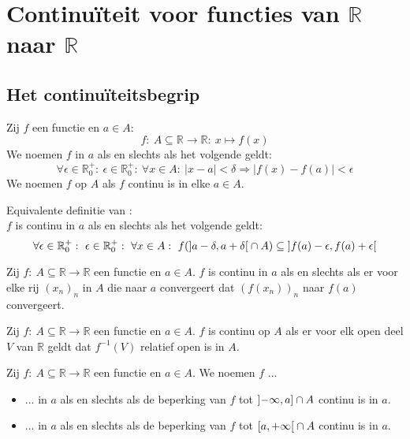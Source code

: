 \documentclass[main.tex]{subfiles}
\begin{document}
\chapter{Continu\"iteit voor functies van $\mathbb{R}$ naar $\mathbb{R}$}
\label{cha:cont-in-r}

\section{Het continu\"iteitsbegrip}
\label{sec:het-cont}


\begin{de}
  Zij $f$ een functie en $a\in A$:
  \[ f:\ A \subseteq \mathbb{R} \rightarrow \mathbb{R}:\ x \mapsto f(x) \]
  We noemen $f$  in $a$ als en slechts als het volgende geldt:
  \[ \forall \epsilon \in \mathbb{R}_{0}^{+}:\ \epsilon \in \mathbb{R}_{0}^{+}:\ \forall x\in A:\ |x-a| < \delta \Rightarrow |f(x) -f(a)| < \epsilon \]
  We noemen $f$  op $A$ als $f$ continu is in elke $a\in A$.
\end{de}

\begin{st}
  Equivalente definitie van :\\
  $f$ is continu in $a$ als en slechts als het volgende geldt:
  \[ \forall \epsilon \in \mathbb{R}_{0}^{+}:\ \epsilon \in \mathbb{R}_{0}^{+}:\ \forall x\in A:\ f(\interval[open]{a-\delta}{a+\delta} \cap A) \subseteq \interval[open]{f(a)-\epsilon}{f(a)+\epsilon} \]
\end{st}

\begin{pr}
  Zij $f:\ A \subseteq \mathbb{R} \rightarrow \mathbb{R}$ een functie en $a\in A$.
  $f$ is continu in $a$ als en slechts als er voor elke rij $(x_{n})_{n}$ in $A$ die naar $a$ convergeert dat $(f(x_{n}))_{n}$ naar $f(a)$ convergeert.
\end{pr}

\begin{pr}
  Zij $f:\ A \subseteq \mathbb{R} \rightarrow \mathbb{R}$ een functie en $a\in A$.
  $f$ is continu op $A$ als er voor elk open deel $V$ van $\mathbb{R}$ geldt dat $f^{-1}(V)$ relatief open is in $A$.
\end{pr}

\begin{de}
  Zij $f:\ A \subseteq \mathbb{R} \rightarrow \mathbb{R}$ een functie en $a\in A$.
  We noemen $f$ ...
  \begin{itemize}
  \item ... in $a$ als en slechts als de beperking van $f$ tot $\interval[open left]{-\infty}{a} \cap A$ continu is in $a$.
  \item ... in $a$ als en slechts als de beperking van $f$ tot $\interval[open right]{a}{+\infty} \cap A$ continu is in $a$.
  \end{itemize}
\end{de}
\end{document}
